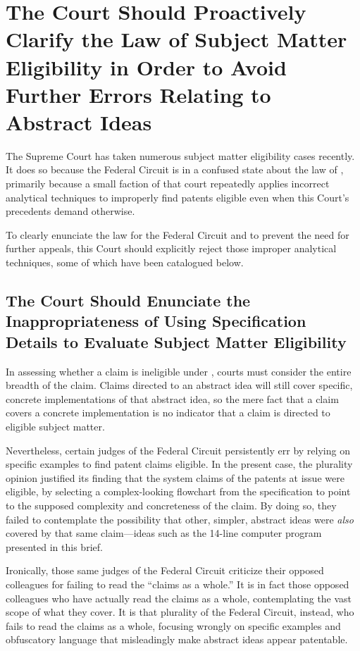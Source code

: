 \documentclass{scotus}
\begin{document}
\section{The Court Should Proactively Clarify the Law of Subject Matter
Eligibility in Order to Avoid Further Errors Relating to Abstract Ideas}

The Supreme Court has taken numerous subject matter eligibility cases recently.
It does so because the Federal Circuit is in a confused state about the law of
, primarily because a small faction of that court repeatedly applies
incorrect analytical techniques to improperly find patents eligible even when
this Court's precedents demand otherwise.

To clearly enunciate the law for the Federal Circuit and to prevent the need for
further appeals, this Court should explicitly reject those improper analytical
techniques, some of which have been catalogued below.

\subsection{The Court Should Enunciate the Inappropriateness of Using
Specification Details to Evaluate Subject Matter Eligibility}

In assessing whether a claim is ineligible under , courts must
consider the entire breadth of the claim. Claims directed to an abstract idea
will still cover specific, concrete implementations of that abstract idea, so
the mere fact that a claim covers a concrete implementation is no indicator that
a claim is directed to eligible subject matter.

Nevertheless, certain judges of the Federal Circuit persistently err by relying
on specific examples to find patent claims eligible. In the present case, the
plurality opinion justified its finding that the system claims of the patents at
issue were eligible, by selecting a complex-looking flowchart from the
specification to point to the supposed complexity and concreteness of the claim.
By doing so, they failed to contemplate the possibility that other, simpler,
abstract ideas were \emph{also} covered by that same claim---ideas such as the
14-line computer program presented in this brief.

Ironically, those same judges of the Federal Circuit criticize their opposed
colleagues for failing to read the ``claims as a whole.'' It is in fact those
opposed colleagues who have actually read the claims as a whole, contemplating
the vast scope of what they cover. It is that plurality of the Federal Circuit,
instead, who fails to read the claims as a whole, focusing wrongly on specific
examples and obfuscatory language that misleadingly make abstract ideas appear
patentable.
\end{document}
